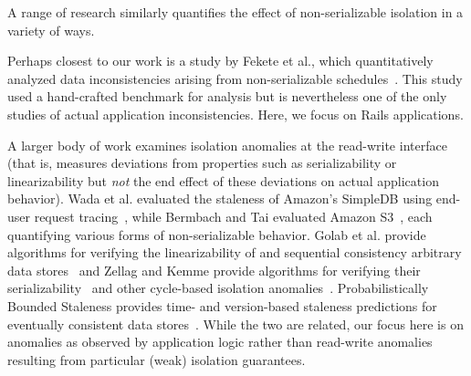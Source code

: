  A range of research similarly
quantifies the effect of non-serializable isolation in a variety of
ways.

Perhaps closest to our work is a study by Fekete et al., which
quantitatively analyzed data inconsistencies arising from
non-serializable schedules~\cite{fekete-quantifying}. This study used
a hand-crafted benchmark for analysis but is nevertheless one of the only
studies of actual application inconsistencies. Here, we focus on Rails
applications.

A larger body of work examines isolation anomalies at the read-write
interface (that is, measures deviations from properties such as
serializability or linearizability but \textit{not} the end effect of
these deviations on actual application behavior). Wada et
al. evaluated the staleness of Amazon's SimpleDB using end-user
request tracing~\cite{wada-data}, while Bermbach and Tai evaluated
Amazon S3~\cite{bermbach-eventual}, each quantifying various forms of
non-serializable behavior. Golab et al. provide algorithms for
verifying the linearizability of and sequential consistency arbitrary
data stores~\cite{golab-analyzing} and Zellag and Kemme provide
algorithms for verifying their
serializability~\cite{zellag-consistent} and other cycle-based
isolation anomalies~\cite{zellag-real}. Probabilistically Bounded
Staleness provides time- and version-based staleness predictions for
eventually consistent data stores~\cite{pbs}. While the two are
related, our focus here is on anomalies as observed by application
logic rather than read-write anomalies resulting from particular
(weak) isolation guarantees.


